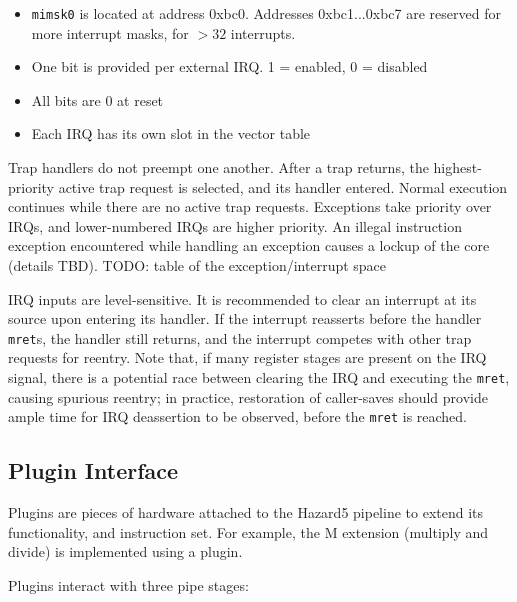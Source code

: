 \begin{itemize}
	\item {\tt mimsk0} is located at address 0xbc0. Addresses 0xbc1...0xbc7 are reserved for more interrupt masks, for $>32$ interrupts.
	\item One bit is provided per external IRQ. 1 = enabled, 0 = disabled
	\item All bits are 0 at reset
	\item Each IRQ has its own slot in the vector table
\end{itemize}

Trap handlers do not preempt one another. After a trap returns, the highest-priority active trap request is selected, and its handler entered. Normal execution continues while there are no active trap requests. Exceptions take priority over IRQs, and lower-numbered IRQs are higher priority. An illegal instruction exception encountered while handling an exception causes a lockup of the core (details TBD). TODO: table of the exception/interrupt space

IRQ inputs are level-sensitive. It is recommended to clear an interrupt at its source upon entering its handler. If the interrupt reasserts before the handler {\tt mret}s, the handler still returns, and the interrupt competes with other trap requests for reentry. Note that, if many register stages are present on the IRQ signal, there is a potential race between clearing the IRQ and executing the {\tt mret}, causing spurious reentry; in practice, restoration of caller-saves should provide ample time for IRQ deassertion to be observed, before the {\tt mret} is reached.


\subsection{Plugin Interface}

Plugins are pieces of hardware attached to the Hazard5 pipeline to extend its functionality, and instruction set. For example, the M extension (multiply and divide) is implemented using a plugin.

Plugins interact with three pipe stages:

